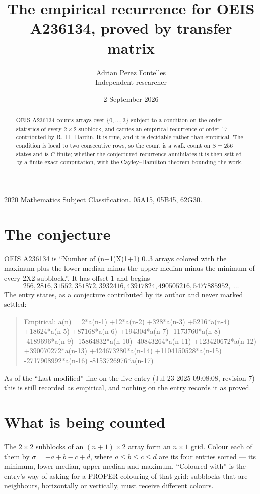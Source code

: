 \documentclass[11pt,a4paper]{article}
\title{The empirical recurrence for OEIS A236134, proved by transfer matrix}
\author{Adrian Perez Fontelles\\ \small Independent researcher}
\date{2 September 2026}
\theoremstyle{plain}
\theoremstyle{definition}
\begin{document}
\maketitle

\begin{abstract}
OEIS A236134 counts arrays over $\{0,\dots,3\}$ subject to a condition on the order
statistics of every $2\times2$ subblock, and carries an empirical recurrence of order
$17$ contributed by R.~H.~Hardin. It is true, and it is decidable rather than empirical.
The condition is local to two consecutive rows, so the count is a walk count on $S=256$
states and is $C$-finite; whether the conjectured recurrence annihilates it is then settled by
a finite exact computation, with the Cayley--Hamilton theorem bounding the work.
\end{abstract}

\noindent\small 2020 Mathematics Subject Classification. 05A15, 05B45, 62G30.\normalsize

\section{The conjecture}

OEIS A236134 is ``Number of (n+1)X(1+1) 0..3 arrays colored with the maximum plus the lower median minus the upper median minus the minimum of every 2X2 subblock.''. It has offset $1$ and begins
\[
256, 2816, 31552, 351872, 3932416, 43917824, 490505216, 5477885952,\ \dots
\]
The entry states, as a conjecture contributed by its author and never marked settled:
\begin{quote}
Empirical: a(n) = 2*a(n-1) +12*a(n-2) +328*a(n-3) +5216*a(n-4) +18624*a(n-5) +87168*a(n-6) +194304*a(n-7) -1173760*a(n-8) -4189696*a(n-9) -15864832*a(n-10) -40843264*a(n-11) +123420672*a(n-12) +390070272*a(n-13) +424673280*a(n-14) +1104150528*a(n-15) -2717908992*a(n-16) -8153726976*a(n-17)
\end{quote}
As of the ``Last modified'' line on the live entry (Jul 23 2025 09:08:08, revision 7) this is still
recorded as empirical, and nothing on the entry records it as proved.

\section{What is being counted}

The $2\times2$ subblocks of an $(n+1)\times2$ array form an
$n\times1$ grid. Colour each of them by $\sigma=-a+b-c+d$, where $a\le b\le c\le d$ are its four entries sorted --- its minimum, lower median, upper median and maximum. ``Coloured with'' is the entry's way of
asking for a PROPER colouring of that grid: subblocks that are neighbours, horizontally or
vertically, must receive different colours.
\end{document}
